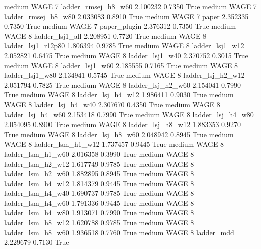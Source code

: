    medium     WAGE                 7    ladder_rmsej_h8_w60   2.100232      0.7350    True
    medium     WAGE                 7    ladder_rmsej_h8_w80   2.033083      0.8910    True
    medium     WAGE                 7                  paper   2.352335      0.7350    True
    medium     WAGE                 7           paper_plugin   2.376312      0.7350    True
    medium     WAGE                 8        ladder_lsj1_all   2.208951      0.7720    True
    medium     WAGE                 8     ladder_lsj1_r12p80   1.806394      0.9785    True
    medium     WAGE                 8        ladder_lsj1_w12   2.052821      0.6475    True
    medium     WAGE                 8        ladder_lsj1_w40   2.370752      0.3015    True
    medium     WAGE                 8        ladder_lsj1_w60   2.185555      0.7165    True
    medium     WAGE                 8        ladder_lsj1_w80   2.134941      0.5745    True
    medium     WAGE                 8      ladder_lsj_h2_w12   2.051794      0.7825    True
    medium     WAGE                 8      ladder_lsj_h2_w60   2.154041      0.7990    True
    medium     WAGE                 8      ladder_lsj_h4_w12   1.986411      0.9030    True
    medium     WAGE                 8      ladder_lsj_h4_w40   2.307670      0.4350    True
    medium     WAGE                 8      ladder_lsj_h4_w60   2.153418      0.7990    True
    medium     WAGE                 8      ladder_lsj_h4_w80   2.054095      0.8900    True
    medium     WAGE                 8      ladder_lsj_h8_w12   1.883353      0.9270    True
    medium     WAGE                 8      ladder_lsj_h8_w60   2.048942      0.8945    True
    medium     WAGE                 8      ladder_lsm_h1_w12   1.737457      0.9445    True
    medium     WAGE                 8      ladder_lsm_h1_w60   2.016358      0.3990    True
    medium     WAGE                 8      ladder_lsm_h2_w12   1.617749      0.9785    True
    medium     WAGE                 8      ladder_lsm_h2_w60   1.882895      0.8945    True
    medium     WAGE                 8      ladder_lsm_h4_w12   1.814379      0.9445    True
    medium     WAGE                 8      ladder_lsm_h4_w40   1.690737      0.9785    True
    medium     WAGE                 8      ladder_lsm_h4_w60   1.791336      0.9445    True
    medium     WAGE                 8      ladder_lsm_h4_w80   1.913071      0.7990    True
    medium     WAGE                 8      ladder_lsm_h8_w12   1.620788      0.9785    True
    medium     WAGE                 8      ladder_lsm_h8_w60   1.936518      0.7760    True
    medium     WAGE                 8             ladder_mdd   2.229679      0.7130    True
